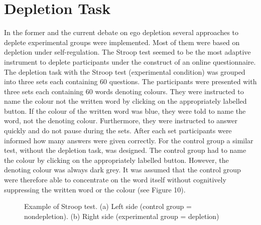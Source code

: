 \section{Depletion Task}
In the former \citep{muraven1998self,baumeister2002yielding} and the current \citep{unger2011ego,pocheptsova2009deciding} debate on ego depletion several approaches to deplete experimental groups were implemented. Most of them were based on depletion under self-regulation. The Stroop test \citep{stroop1935studies} seemed to be the most adaptive instrument to deplete participants under the construct of an online questionnaire. The depletion task with the Stroop test (experimental condition) was grouped into three sets each containing 60 questions. The participants were presented with three sets each containing 60 words denoting colours. They were instructed to name the colour not the written word by clicking on the appropriately labelled button. If the colour of the written word was blue, they were told to name the word, not the denoting colour. Furthermore, they were instructed to answer quickly and do not pause during the sets. After each set participants were informed how many answers were given correctly. For the control group a similar test, without the depletion task, was designed. The control group had to name the colour by clicking on the appropriately labelled button. However, the denoting colour was always dark grey. It was assumed that the control group were therefore able to concentrate on the word itself without cognitively suppressing the written word or the colour (see Figure 10). 

\begin{figure}[h!]
  \begin{center}
    \caption{Example of Stroop test. (a) Left side (control group = nondepletion). (b) Right side (experimental group = depletion)}\label{fig:green_vs_pink}
  \end{center}
\end{figure}
